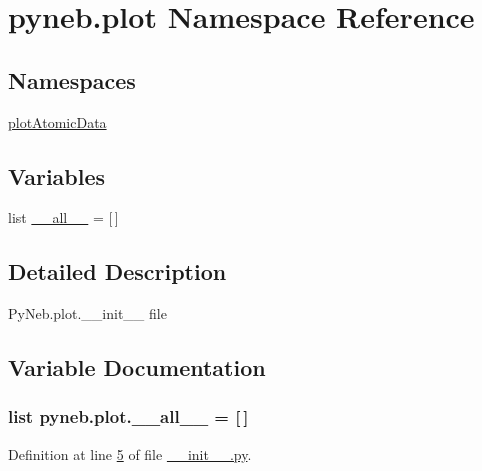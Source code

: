 \hypertarget{namespacepyneb_1_1plot}{}\section{pyneb.\+plot Namespace Reference}
\label{namespacepyneb_1_1plot}
\subsection*{Namespaces}
\begin{DoxyCompactItemize}
\item 
 \hyperlink{namespacepyneb_1_1plot_1_1plot_atomic_data}{plot\+Atomic\+Data}
\end{DoxyCompactItemize}
\subsection*{Variables}
\begin{DoxyCompactItemize}
\item 
list \hyperlink{namespacepyneb_1_1plot_a66a8860c2cc0db67a520645120e8bc7b}{\+\_\+\+\_\+all\+\_\+\+\_\+} = \mbox{[}$\,$\mbox{]}
\end{DoxyCompactItemize}


\subsection{Detailed Description}
\begin{DoxyVerb}PyNeb.plot.__init__ file\end{DoxyVerb}
 

\subsection{Variable Documentation}
\hypertarget{namespacepyneb_1_1plot_a66a8860c2cc0db67a520645120e8bc7b}{}
\subsubsection[{\+\_\+\+\_\+all\+\_\+\+\_\+}]{\setlength{\rightskip}{0pt plus 5cm}list pyneb.\+plot.\+\_\+\+\_\+all\+\_\+\+\_\+ = \mbox{[}$\,$\mbox{]}}\label{namespacepyneb_1_1plot_a66a8860c2cc0db67a520645120e8bc7b}


Definition at line \hyperlink{plot_2____init_____8py_source_l00005}{5} of file \hyperlink{plot_2____init_____8py_source}{\+\_\+\+\_\+init\+\_\+\+\_\+.\+py}.

